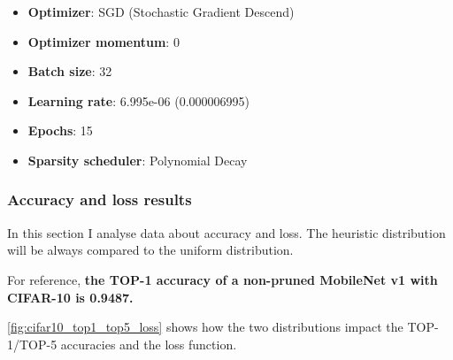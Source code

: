 \begin{itemize}
    \item \textbf{Optimizer}: SGD (Stochastic Gradient Descend)
    \item \textbf{Optimizer momentum}: 0
    \item \textbf{Batch size}: 32
    \item \textbf{Learning rate}: 6.995e-06 (0.000006995)
    \item \textbf{Epochs}: 15
    \item \textbf{Sparsity scheduler}: Polynomial Decay
\end{itemize}

\subsubsection{Accuracy and loss results}
In this section I analyse data about accuracy and loss. The heuristic
distribution will be always compared to the uniform distribution.

For reference, \textbf{the TOP-1 accuracy of a non-pruned MobileNet v1 with
CIFAR-10 is 0.9487.}

\autoref{fig:cifar10_top1_top5_loss} shows how the two distributions impact the
TOP-1/TOP-5 accuracies and the loss function.


